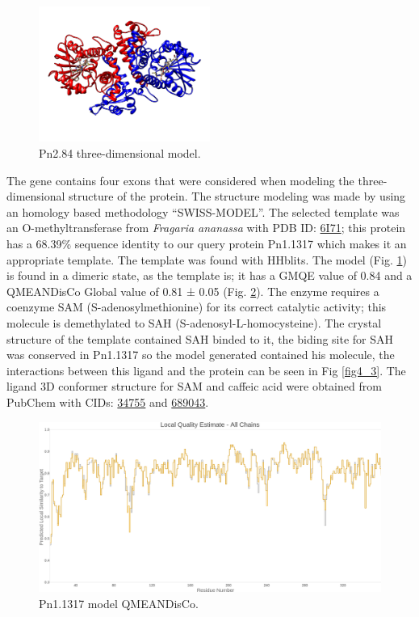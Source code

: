 \documentclass[12pt]{article}
\begin{document}
	
	\FloatBarrier
	\begin{figure}
		\centering
		\includegraphics[width=0.5\textwidth]{../4/Swiss/model2.png}
		\caption{Pn2.84 three-dimensional model.}
		\label{fig4_1}
	\end{figure}
	\FloatBarrier
	
	The gene contains four exons that were considered when modeling the three-dimensional structure of the protein. The structure modeling was made by using an homology based methodology ``SWISS-MODEL''. \cite{swiss} The selected template was an O-methyltransferase from \textit{Fragaria ananassa} with PDB ID: \href{https://www.rcsb.org/structure/6I71}{6I71}; this protein has a 68.39\% sequence identity to our query protein Pn1.1317 which makes it an appropriate template. The template was found with HHblits. \cite{hhblits} The model (Fig. \ref{fig4_1}) is found in a dimeric state, as the template is; it has a GMQE value of 0.84 and a QMEANDisCo Global value of 0.81 ± 0.05 (Fig. \ref{fig4_2}). \cite{qmeandisco_swiss}	The enzyme requires a coenzyme SAM (S-adenosylmethionine) for its correct catalytic activity; this molecule is demethylated to SAH (S-adenosyl-L-homocysteine). The crystal structure of the template contained SAH binded to it, the biding site for SAH was conserved in Pn1.1317 so the model generated contained his molecule, the interactions between this ligand and the protein can be seen in Fig \ref{fig4_3}. The ligand 3D conformer structure for SAM and caffeic acid were obtained from PubChem with CIDs: \href{https://pubchem.ncbi.nlm.nih.gov/compound/34755}{34755} and \href{https://pubchem.ncbi.nlm.nih.gov/compound/689043}{689043}.
	
	\FloatBarrier
	\begin{figure}[h!]
		\centering
		\includegraphics[width=\textwidth-50pt]{../4/Swiss/Local_quality_estimate.png}
		\caption{Pn1.1317 model QMEANDisCo.}
		\label{fig4_2}
	\end{figure}
	\FloatBarrier
	
\end{document}

